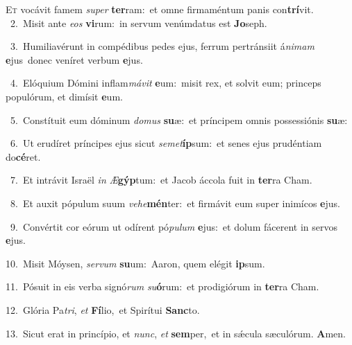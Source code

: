 \lettrine{\initial\textcolor{\initialcolor}{E}}{t} vocávit famem \textit{su}\-\textit{per} \textbf{ter}\-ram:~\star et omne firmaméntum panis con\-\textbf{trí}\-vit.\\
{\numbfont\textcolor{\numbcolor}{~2.}}~Misit ante \textit{e}\-\textit{os} \textbf{vi}\-rum:~\star in servum venúmdatus est \textbf{Jo}\-seph.\par
{\numbfont\textcolor{\numbcolor}{~3.}}~Humiliavérunt in compédibus pedes ejus, ferrum pertránsiit á\-\textit{ni}\-\textit{mam} \textbf{e}\-jus~\star donec veníret verbum \textbf{e}\-jus.\par
{\numbfont\textcolor{\numbcolor}{~4.}}~Elóquium Dómini inflam\-\textit{má}\-\textit{vit} \textbf{e}\-um:~\star misit rex, et solvit eum; princeps populórum, et dimísit \textbf{e}\-um.\par
{\numbfont\textcolor{\numbcolor}{~5.}}~Constítuit eum dóminum \textit{do}\-\textit{mus} \textbf{su}\-æ:~\star et príncipem omnis possessiónis \textbf{su}\-æ:\par
{\numbfont\textcolor{\numbcolor}{~6.}}~Ut erudíret príncipes ejus sicut \textit{se}\-\textit{met}\textbf{íp}sum:~\star et senes ejus prudéntiam do\-\textbf{cé}\-ret.\par
{\numbfont\textcolor{\numbcolor}{~7.}}~Et intrávit Israël \textit{in} \textit{Æ}\-\textbf{gýp}tum:~\star et Jacob áccola fuit in \textbf{ter}\-ra Cham.\par
{\numbfont\textcolor{\numbcolor}{~8.}}~Et auxit pópulum suum \textit{ve}\-\textit{he}\textbf{mén}ter:~\star et firmávit eum super inimícos \textbf{e}\-jus.\par
{\numbfont\textcolor{\numbcolor}{~9.}}~Convértit cor eórum ut odírent pó\-\textit{pu}\-\textit{lum} \textbf{e}\-jus:~\star et dolum fácerent in servos \textbf{e}\-jus.\par
{\numbfont\textcolor{\numbcolor}{10.}}~Misit Móysen, \textit{ser}\-\textit{vum} \textbf{su}\-um:~\star Aaron, quem elégit \textbf{ip}\-sum.\par
{\numbfont\textcolor{\numbcolor}{11.}}~Pósuit in eis verba signó\textit{rum} \textit{su}\-\textbf{ó}rum:~\star et prodigiórum in \textbf{ter}\-ra Cham.\par
{\numbfont\textcolor{\numbcolor}{12.}}~Glória Pa\-\textit{tri}\-, \textit{et} \textbf{Fí}\-lio,~\star et Spirítui \textbf{Sanc}\-to.\par
{\numbfont\textcolor{\numbcolor}{13.}}~Sicut erat in princípio, et \textit{nunc}\-, \textit{et} \textbf{sem}\-per,~\star et in sǽcula sæculórum. \textbf{A}\-men.\par
